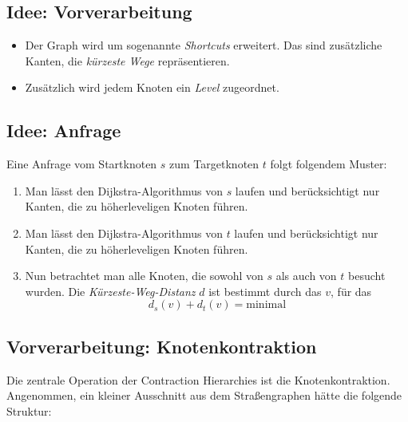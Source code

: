 \documentclass{scrartcl}%
\begin{document}
    \subsection*{Idee: Vorverarbeitung}\label{subsec:idee:Vorverarbeitung}
    \begin{itemize}
        \item Der Graph wird um sogenannte \textit{Shortcuts} erweitert.
        Das sind zusätzliche Kanten, die \textit{kürzeste Wege} repräsentieren.
        \item Zusätzlich wird jedem Knoten ein \textit{Level} zugeordnet.
    \end{itemize}

    \subsection*{Idee: Anfrage}
    Eine Anfrage vom Startknoten $s$ zum Targetknoten $t$ folgt folgendem Muster:
    \begin{enumerate}
        \item Man lässt den Dijkstra-Algorithmus von $s$ laufen und berücksichtigt nur Kanten, die zu höherleveligen Knoten führen.
        \item Man lässt den Dijkstra-Algorithmus von $t$ laufen und berücksichtigt nur Kanten, die zu höherleveligen Knoten führen.
        \item Nun betrachtet man alle Knoten, die sowohl von $s$ als auch von $t$ besucht wurden. Die
        \textit{Kürzeste-Weg-Distanz} $d$ ist bestimmt durch das $v$, für das
        \begin{equation*}
            d_s(v) + d_t(v) = \text{minimal}
        \end{equation*}
    \end{enumerate}

    \subsection*{Vorverarbeitung: Knotenkontraktion}
    Die zentrale Operation der Contraction Hierarchies ist die Knotenkontraktion. Angenommen, ein kleiner Ausschnitt aus dem Straßengraphen hätte die folgende Struktur:
    \begin{figure}[htb]
        \centering
    \end{figure}
\end{document}
